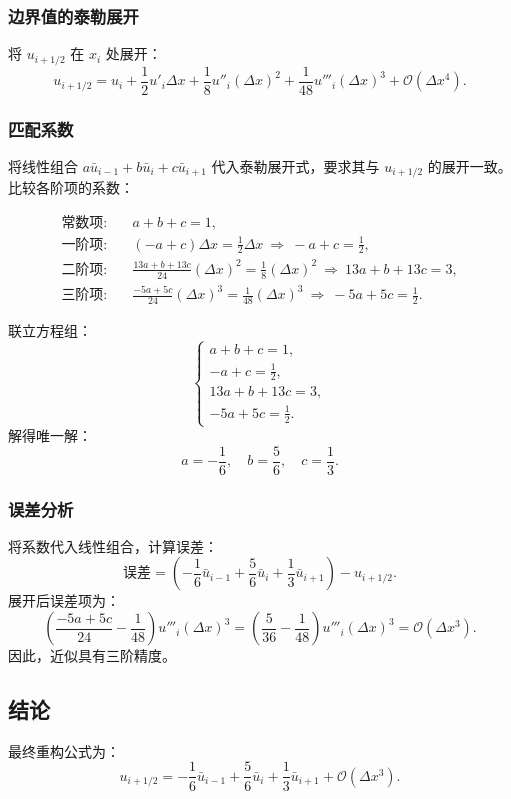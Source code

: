 \documentclass{ctexart}
\begin{document}
\subsubsection{边界值的泰勒展开}
将 \(u_{i+1/2}\) 在 \(x_i\) 处展开：
\begin{equation}
u_{i+1/2} = u_i + \frac{1}{2} u'_i \Delta x + \frac{1}{8} u''_i (\Delta x)^2 + \frac{1}{48} u'''_i (\Delta x)^3 + \mathcal{O}(\Delta x^4).
\end{equation}

\subsubsection{匹配系数}
将线性组合 \(a \bar{u}_{i-1} + b \bar{u}_i + c \bar{u}_{i+1}\) 代入泰勒展开式，要求其与 \(u_{i+1/2}\) 的展开一致。比较各阶项的系数：

\begin{align}
\text{常数项:} & \quad a + b + c = 1, \\
\text{一阶项:} & \quad (-a + c) \Delta x = \frac{1}{2} \Delta x \ \Rightarrow \ -a + c = \frac{1}{2}, \\
\text{二阶项:} & \quad \frac{13a + b + 13c}{24} (\Delta x)^2 = \frac{1}{8} (\Delta x)^2 \ \Rightarrow \ 13a + b + 13c = 3, \\
\text{三阶项:} & \quad \frac{-5a + 5c}{24} (\Delta x)^3 = \frac{1}{48} (\Delta x)^3 \ \Rightarrow \ -5a + 5c = \frac{1}{2}.
\end{align}

联立方程组：
\[
\begin{cases}
a + b + c = 1, \\
-a + c = \frac{1}{2}, \\
13a + b + 13c = 3, \\
-5a + 5c = \frac{1}{2}.
\end{cases}
\]
解得唯一解：
\[
a = -\frac{1}{6}, \quad b = \frac{5}{6}, \quad c = \frac{1}{3}.
\]

\subsubsection{误差分析}
将系数代入线性组合，计算误差：
\[
\text{误差} = \left(-\frac{1}{6} \bar{u}_{i-1} + \frac{5}{6} \bar{u}_i + \frac{1}{3} \bar{u}_{i+1}\right) - u_{i+1/2}.
\]
展开后误差项为：
\[
\left(\frac{-5a + 5c}{24} - \frac{1}{48}\right) u'''_i (\Delta x)^3 = \left(\frac{5}{36} - \frac{1}{48}\right) u'''_i (\Delta x)^3 = \mathcal{O}(\Delta x^3).
\]
因此，近似具有三阶精度。

\subsection{结论}
最终重构公式为：
\[
u_{i+1/2} = -\frac{1}{6} \bar{u}_{i-1} + \frac{5}{6} \bar{u}_i + \frac{1}{3} \bar{u}_{i+1} + \mathcal{O}(\Delta x^3).
\]
\end{document}
